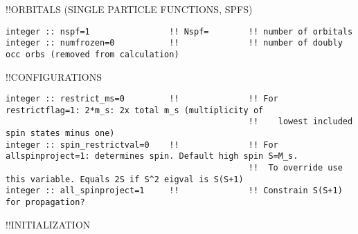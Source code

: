 !!{\large \quad ORBITALS (SINGLE PARTICLE FUNCTIONS, SPFS)}
\begin{verbatim}
integer :: nspf=1                !! Nspf=        !! number of orbitals
integer :: numfrozen=0           !!              !! number of doubly occ orbs (removed from calculation)
\end{verbatim}
!!{\large \quad CONFIGURATIONS}
\begin{verbatim}
integer :: restrict_ms=0         !!              !! For restrictflag=1: 2*m_s: 2x total m_s (multiplicity of 
                                                 !!    lowest included spin states minus one)
integer :: spin_restrictval=0    !!              !! For allspinproject=1: determines spin. Default high spin S=M_s.
                                                 !!  To override use this variable. Equals 2S if S^2 eigval is S(S+1)
integer :: all_spinproject=1     !!              !! Constrain S(S+1) for propagation?
\end{verbatim}
!!{\large \quad INITIALIZATION}
